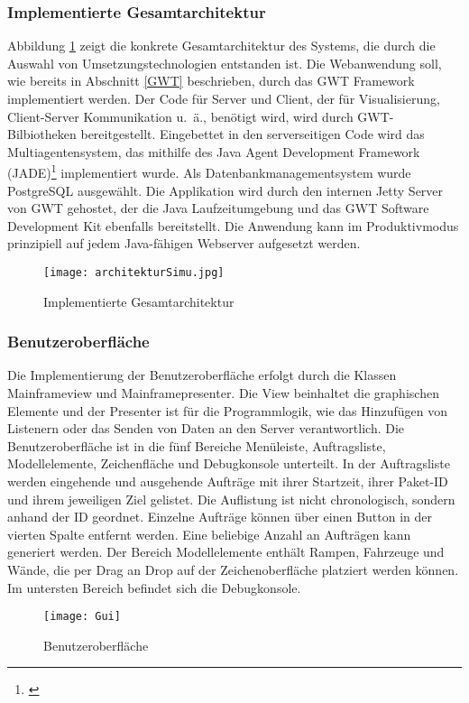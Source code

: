 \subsubsection{Implementierte Gesamtarchitektur}
Abbildung \ref{GAI} zeigt die konkrete Gesamtarchitektur des Systems, die durch die Auswahl von Umsetzungstechnologien entstanden ist. Die Webanwendung soll, wie bereits in Abschnitt \ref{GWT} beschrieben, durch das GWT Framework implementiert werden. Der Code für Server und Client, der für Visualisierung, Client-Server Kommunikation u.~ä., benötigt wird, wird durch GWT-Bilbiotheken bereitgestellt. Eingebettet in den serverseitigen Code wird das Multiagentensystem, das mithilfe des Java Agent Development Framework (JADE)\footnote{\cite{jade}} implementiert wurde. Als Datenbankmanagementsystem wurde PostgreSQL ausgewählt. Die Applikation wird durch den internen Jetty Server von GWT gehostet, der die Java Laufzeitumgebung und das GWT Software Development Kit ebenfalls bereitstellt. Die Anwendung kann im Produktivmodus prinzipiell auf jedem Java-fähigen Webserver aufgesetzt werden.  
\begin{figure}[h!]
	\centering
		\texttt{[image: architekturSimu.jpg]}        
		\caption{Implementierte Gesamtarchitektur}
	\label{GAI}
\end{figure}
\subsubsection{Benutzeroberfläche}
Die Implementierung der Benutzeroberfläche erfolgt durch die Klassen Mainframeview und Mainframepresenter. Die View beinhaltet die graphischen Elemente und der Presenter ist für die Programmlogik, wie das Hinzufügen von Listenern oder das Senden von Daten an den Server verantwortlich. Die Benutzeroberfläche ist in die fünf Bereiche Menüleiste, Auftragsliste, Modellelemente, Zeichenfläche und Debugkonsole unterteilt. In der Auftragsliste werden eingehende und ausgehende Aufträge mit ihrer Startzeit, ihrer Paket-ID und ihrem jeweiligen Ziel gelistet. Die Auflistung ist nicht chronologisch, sondern anhand der ID geordnet. Einzelne Aufträge können über einen Button in der vierten Spalte entfernt werden. Eine beliebige Anzahl an Aufträgen kann generiert werden. Der Bereich Modellelemente enthält Rampen, Fahrzeuge und Wände, die per Drag an Drop auf der Zeichenoberfläche platziert werden können. Im untersten Bereich befindet sich die Debugkonsole. 
\begin{figure}[h!]
	\centering
		\texttt{[image: Gui]}        
		\caption{Benutzeroberfläche}
	\label{GUIIMPL}
\end{figure}
